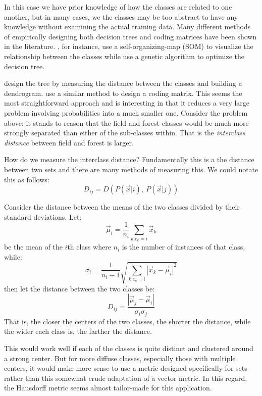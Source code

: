 \documentclass{article}
\begin{document}
In this case we have prior knowledge of how the classes are related to one another,
but in many cases, we the classes may be too abstract to have any knowledge without examining the actual training data.
Many different methods of empirically designing both decision trees and coding matrices have been shown in the literature.
\citet{Cheong_etal2004}, for instance, use a self-organizing-map (SOM)
\cite{Kohonen2000} to visualize the relationship between the classes while
\citet{Lee_Oh2003} use a genetic algorithm to optimize the decision tree.

\citet{Benabdeslem_Bennani2006} design the tree by measuring the distance between
the classes and building a dendrogram.
\citet{Zhou_etal2008} use a similar method to design a coding matrix.
This seems the most straightforward approach and is interesting in that it reduces a very large problem involving probabilities into a much smaller one.
Consider the problem above: it stands to reason that the field and forest classes would be much more strongly separated than either of the sub-classes within.
That is the {\it interclass distance} between field and forest is larger.

How do we measure the interclass distance? Fundamentally this is a the distance between two sets and there are many methods of measuring this.
We could notate this as follows:
\begin{equation}
	D_{ij}=D(P(\vec x|i),~P(\vec x|j))
\end{equation}

Consider the distance between the means of the two classes divided by their standard deviations. Let:
\begin{equation}
	\vec \mu_i = \frac{1}{n_i} \sum_{k|c_k=i} \vec x_k
\end{equation}
be the mean of the $i$th class where $n_i$ is the number of instances of that class, while:
\begin{equation}
	\sigma_i = \frac{1}{n_i-1}\sqrt{\sum_{k|c_k=i}|\vec x_k - \vec \mu_i|^2}
\end{equation}
then let the distance between the two classes be:
\begin{equation}
	D_{ij}=\frac{|\vec \mu_j - \vec \mu_i |}{\sigma_i \sigma_j}
\end{equation}
That is, the closer the centers of the two classes, the shorter the distance, while the wider each class is, the farther the distance.
	
This would work well if each of the classes is quite distinct and clustered around a strong center.
But for more diffuse classes, especially those with multiple centers, it would make more sense to use a metric designed specifically for sets rather than this somewhat crude adaptation of a vector metric.
In this regard, the Hausdorff metric seems almost tailor-made for this application.


\end{document}
